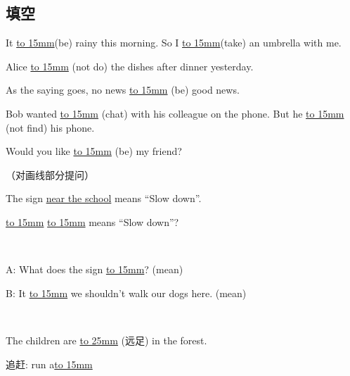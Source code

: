 \subsection{填空}
\item{
    It \underline{\hbox to 15mm{}}(be) rainy this morning. So I \underline{\hbox to 15mm{}}(take) an umbrella with me.
}
\\
\item{
    Alice \underline{\hbox to 15mm{}} (not do) the dishes after dinner yesterday.
}
\\
\item{
    As the saying goes, no news \underline{\hbox to 15mm{}} (be) good news.
}
\\
\item{
    Bob wanted \underline{\hbox to 15mm{}} (chat) with his colleague on the phone. But he \underline{\hbox to 15mm{}} (not find) his phone.
}
\\
\item{
    Would you like \underline{\hbox to 15mm{}} (be) my friend?
}
\\
\item{
    （对画线部分提问）

    The sign \underline{near the school} means ``Slow down''.

    \underline{\hbox to 15mm{}} \underline{\hbox to 15mm{}} means ``Slow down''?
}
\\
\item{
    A: What does the sign \underline{\hbox to 15mm{}}? (mean)

    B: It \underline{\hbox to 15mm{}} we shouldn't walk our dogs here. (mean)
}
\\
\item{
    The children are \underline{\hbox to 25mm{}} (远足) in the forest.
}
\\
\item{
    追赶: run a\underline{\hbox to 15mm{}}
}
